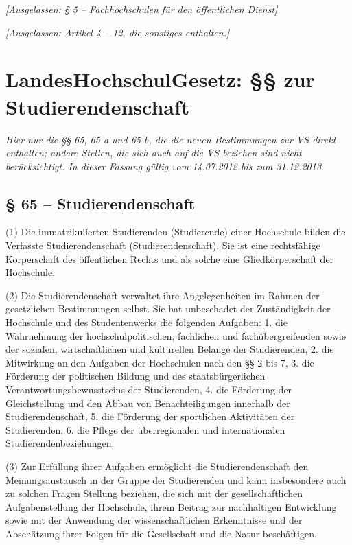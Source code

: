 \documentclass[
10pt,
a4paper,
twoside,								%
titlepage=false,							%
draft=false								%
]{scrartcl}
\begin{document}
\emph{[Ausgelassen: § 5 – Fachhochschulen für den öffentlichen Dienst]}


\bigskip
\emph{[Ausgelassen: Artikel 4 – 12, die sonstiges enthalten.]}




\newpage
\section{LandesHochschulGesetz: §§ zur Studierendenschaft}

\emph{Hier nur die §§ 65, 65 a und 65 b, die die neuen Bestimmungen zur VS direkt enthalten; andere Stellen, die sich auch auf die VS beziehen sind nicht berücksichtigt. In dieser Fassung gültig vom 14.07.2012 bis zum 31.12.2013}

\subsection{§ 65 – Studierendenschaft}

(1) Die immatrikulierten Studierenden (Studierende) einer Hochschule bilden die Verfasste Studierendenschaft (Studierendenschaft). Sie ist eine rechtsfähige Körperschaft des öffentlichen Rechts und als solche eine Gliedkörperschaft der Hochschule.

(2) Die Studierendenschaft verwaltet ihre Angelegenheiten im Rahmen der gesetzlichen Bestimmungen selbst. Sie hat unbeschadet der Zuständigkeit der Hochschule und des Studentenwerks die folgenden Aufgaben:
1. die Wahrnehmung der hochschulpolitischen, fachlichen und fachübergreifenden sowie der sozialen, wirtschaftlichen und kulturellen Belange der Studierenden,
2. die Mitwirkung an den Aufgaben der Hochschulen nach den §§ 2 bis 7,
3. die Förderung der politischen Bildung und des staatsbürgerlichen Verantwortungsbewusstseins der Studierenden,
4. die Förderung der Gleichstellung und den Abbau von Benachteiligungen innerhalb der Studierendenschaft,
5. die Förderung der sportlichen Aktivitäten der Studierenden,
6. die Pflege der überregionalen und internationalen Studierendenbeziehungen.

(3) Zur Erfüllung ihrer Aufgaben ermöglicht die Studierendenschaft den Meinungsaustausch in der Gruppe der Studierenden und kann insbesondere auch zu solchen Fragen Stellung beziehen, die sich mit der gesellschaftlichen Aufgabenstellung der Hochschule, ihrem Beitrag zur nachhaltigen Entwicklung sowie mit der Anwendung der wissenschaftlichen Erkenntnisse und der Abschätzung ihrer Folgen für die Gesellschaft und die Natur beschäftigen.
\end{document}
